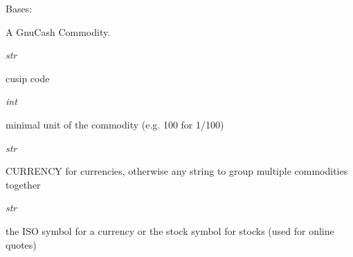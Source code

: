 \documentclass[letterpaper,10pt,english]{sphinxmanual}
\begin{document}
\begin{fulllineitems}
\label{api/piecash.model_core.commodity:piecash.model_core.commodity.Commodity}
Bases: 

A GnuCash Commodity.

\begin{fulllineitems}
\label{api/piecash.model_core.commodity:piecash.model_core.commodity.Commodity.cusip}
\emph{str}

cusip code

\end{fulllineitems}


\begin{fulllineitems}
\label{api/piecash.model_core.commodity:piecash.model_core.commodity.Commodity.fraction}
\emph{int}

minimal unit of the commodity (e.g. 100 for 1/100)

\end{fulllineitems}


\begin{fulllineitems}
\label{api/piecash.model_core.commodity:piecash.model_core.commodity.Commodity.namespace}
\emph{str}

CURRENCY for currencies, otherwise any string to group multiple commodities together

\end{fulllineitems}


\begin{fulllineitems}
\label{api/piecash.model_core.commodity:piecash.model_core.commodity.Commodity.mnemonic}
\emph{str}

the ISO symbol for a currency or the stock symbol for stocks (used for online quotes)

\end{fulllineitems}


\end{fulllineitems}
\end{document}
